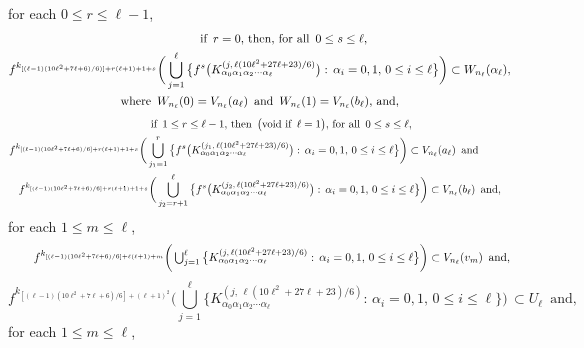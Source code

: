 \documentclass[12pt]{article}
\newcommand{\al}{\alpha}
\begin{document}
\noindent
for each $0 \le r \le \ell-1$, 
\begin{multline*}
$$
\qquad\qquad \text{if} \,\,\, r = 0, \, \text{then}, \, \text{for all} \,\,\, 0 \le s \le \ell, \\
f^{k_{[(\ell-1)(10\ell^2+7\ell+6)/6)]+r(\ell+1)+1+s}}\bigg(\bigcup_{j=1}^\ell \big\{ f^s\big(K_{\al_0\al_1\al_2\cdots\al_\ell}^{(j,\,\ell(10\ell^2+27\ell+23)/6)}\big): \, \al_i = 0, 1, \, 0 \le i \le \ell \big\}\bigg) \subset W_{n_\ell}(\al_\ell), \\ \text{where} \,\,\, W_{n_\ell}(0) = V_{n_\ell}(a_\ell) \,\,\, \text{and} \,\,\, W_{n_\ell}(1) = V_{n_\ell}(b_\ell), \, \text{and},
$$
\end{multline*}
\begin{multline*}
$$
\qquad\qquad \text{if} \,\,\, 1 \le r \le \ell-1, \, \text{then} \,\,\, \big(\text{void if} \,\,\, \ell = 1\big), \, \text{for all} \,\,\, 0 \le s \le \ell, \\
f^{k_{[(\ell-1)(10\ell^2+7\ell+6)/6]+r(\ell+1)+1+s}}\bigg(\bigcup_{j_1=1}^r \big\{ f^s\big(K_{\al_0\al_1\al_2\cdots\al_\ell}^{(j_1,\,\ell(10\ell^2+27\ell+23)/6)}\big): \, \al_i = 0, 1, \, 0 \le i \le \ell \big\}\bigg) \subset V_{n_\ell}(a_\ell) \,\,\, \text{and} \qquad\quad \\ 
f^{k_{[(\ell-1)(10\ell^2+7\ell+6)/6]+r(\ell+1)+1+s}}\bigg(\bigcup_{j_2=r+1}^\ell \big\{ f^s\big(K_{\al_0\al_1\al_2\cdots\al_\ell}^{(j_2,\,\ell(10\ell^2+27\ell+23)/6)}\big): \, \al_i = 0, 1, \, 0 \le i \le \ell \big\}\bigg) \subset V_{n_\ell}(b_\ell) \,\,\,\text{and},
$$
\end{multline*}
for each $1 \le m \le \ell$, 
\begin{multline*}
$$
\qquad\, f^{k_{[(\ell-1)(10\ell^2+7\ell+6)/6]+\ell(\ell+1)+m}}\bigg(\bigcup_{j=1}^\ell \big\{ K_{\al_0\al_1\al_2\cdots\al_\ell}^{(j, \,\ell(10\ell^2+27\ell+23)/6)}: \, \al_i = 0, 1, \, 0 \le i \le \ell \big\}\bigg) \subset V_{n_\ell}(v_m) \,\,\, \text{and},
$$
\end{multline*}
$$
f^{k_{[(\ell-1)(10\ell^2+7\ell+6)/6]+(\ell+1)^2}}\bigg(\bigcup_{j=1}^\ell \big\{ K_{\al_0\al_1\al_2\cdots\al_\ell}^{(j, \,\ell(10\ell^2+27\ell+23)/6)}: \, \al_i = 0, 1, \, 0 \le i \le \ell \big\}\bigg) \, \subset U_\ell \,\,\, \text{and}, \qquad\qquad\quad\,\,
$$
for each $1 \le m \le \ell$,  
\end{document}
